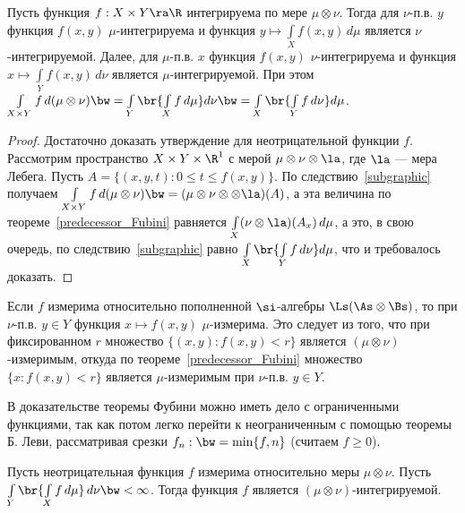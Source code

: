 \documentclass[10pt]{article}
\begin{document}
\begin{theorem}[Фубини]
Пусть функция $f: X\times Y\ra \R$ интегрируема по мере
$\mu\otimes\nu$. Тогда для $\nu$-п.в. $y$ функция $f(x,y)$
$\mu$-интегрируема и функция $y\mapsto \int\limits_Xf(x,y)\,d\mu$
является $\nu$-интегрируемой. Далее, для $\mu$-п.в. $x$ функция
$f(x,y)$ $\nu$-интегрируема и функция $x\mapsto
\int\limits_Yf(x,y)\,d\nu$ является $\mu$-интегрируемой. При этом
$\int\limits_{X\times Y}f\,d(\mu\otimes\nu)\bw =\int\limits_Y
\br{\int\limits_Xf\,d\mu} d\nu\bw =\int\limits_X
\br{\int\limits_Yf\,d\nu} d\mu$.
\end{theorem}

\begin{proof}
Достаточно доказать утверждение для неотрицательной функции $f$.
Рассмотрим пространство $X\times Y\times\R^1$ с мерой
$\mu\otimes\nu\otimes\la$, где $\la$ --- мера Лебега. Пусть
$A=\{(x,y,t):0\le t\le f(x,y)\}$. По следствию~\ref{subgraphic}
получаем $\int\limits_{X\times Y}f\,d(\mu\otimes\nu)\bw
=(\mu\otimes\nu\otimes\otimes\la)(A)$, а эта величина по
теореме~\ref{predecessor_Fubini} равняется
$\int\limits_X(\nu\otimes\la)(A_x)\,d\mu$, а это, в свою очередь, по
следствию~\ref{subgraphic} равно $\int\limits_X
\br{\int\limits_Yf\,d\nu} d\mu$, что и требовалось доказать.
\end{proof}

\begin{note}
Если $f$ измерима относительно пополненной $\si$-алгебры
$\Ls(\As\otimes\Bs)$, то при $\nu$-п.в. $y\in Y$ функция $x\mapsto
f(x,y)$ $\mu$-измерима. Это следует из того, что при фиксированном
$r$ множество $\{(x,y):f(x,y)< r\}$ является
$(\mu\otimes\nu)$-измеримым, откуда по
теореме~\ref{predecessor_Fubini} множество $\{x:f(x,y)<r\}$ является
$\mu$-измеримым при $\nu$-п.в. $y\in Y$.
\end{note}

\begin{note}
В доказательстве теоремы Фубини можно иметь дело с ограниченными
функциями, так как потом легко перейти к неограниченным с помощью
теоремы Б. Леви, рассматривая срезки $f_n:\bw =\min\{f,n\}$ (считаем
$f\ge 0$).
\end{note}

\begin{theorem}[Тонелли]
Пусть неотрицательная функция $f$ измерима относительно меры
$\mu\otimes\nu$. Пусть $\int\limits_Y \br{\int\limits_Xf\,d\mu}
\,d\nu\bw <\infty$. Тогда функция $f$ является
$(\mu\otimes\nu)$-интегрируемой.
\end{theorem}
\end{document}
